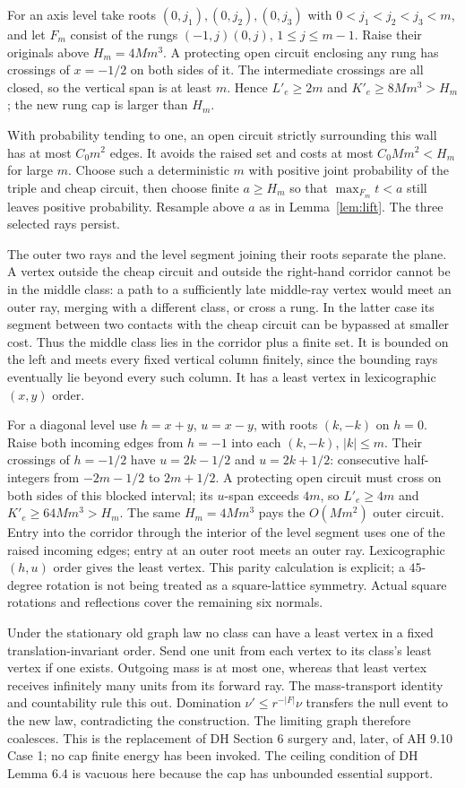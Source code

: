 For an axis level take roots $(0,j_1),(0,j_2),(0,j_3)$ with
$0<j_1<j_2<j_3<m$, and let $F_m$ consist of the rungs
$(-1,j)(0,j)$, $1\le j\le m-1$. Raise their originals above
$H_m=4Mm^3$. A protecting open circuit enclosing any rung has crossings
of $x=-1/2$ on both sides of it. The intermediate crossings are all closed,
so the vertical span is at least $m$. Hence $L'_e\ge2m$ and
$K'_e\ge8Mm^3>H_m$; the new rung cap is larger than $H_m$.

With probability tending to one, an open circuit strictly surrounding this
wall has at most $C_0m^2$ edges. It avoids the raised set and costs at most
$C_0Mm^2<H_m$ for large $m$. Choose such a deterministic $m$ with positive
joint probability of the triple and cheap circuit, then choose finite
$a\ge H_m$ so that $\max_{F_m}t<a$ still leaves positive probability.
Resample above $a$ as in Lemma~\ref{lem:lift}. The three selected rays persist.

The outer two rays and the level segment joining their roots separate the
plane. A vertex outside the cheap circuit and outside the right-hand corridor
cannot be in the middle class: a path to a sufficiently late middle-ray
vertex would meet an outer ray, merging with a different class, or cross a
rung. In the latter case its segment between two contacts with the cheap
circuit can be bypassed at smaller cost. Thus the middle class lies in the
corridor plus a finite set. It is bounded on the left and meets every fixed
vertical column finitely, since the bounding rays eventually lie beyond
every such column. It has a least vertex in lexicographic $(x,y)$ order.

For a diagonal level use $h=x+y$, $u=x-y$, with roots $(k,-k)$ on $h=0$.
Raise both incoming edges from $h=-1$ into each $(k,-k)$, $|k|\le m$.
Their crossings of $h=-1/2$ have $u=2k-1/2$ and $u=2k+1/2$: consecutive
half-integers from $-2m-1/2$ to $2m+1/2$. A protecting open circuit must
cross on both sides of this blocked interval; its $u$-span exceeds $4m$,
so $L'_e\ge4m$ and $K'_e\ge64Mm^3>H_m$. The same $H_m=4Mm^3$ pays the
$O(Mm^2)$ outer circuit. Entry into the corridor through the interior of
the level segment uses one of the raised incoming edges; entry at an outer
root meets an outer ray. Lexicographic $(h,u)$ order gives the least vertex.
This parity calculation is explicit; a $45$-degree rotation is not being
treated as a square-lattice symmetry. Actual square rotations and reflections
cover the remaining six normals.

Under the stationary old graph law no class can have a least vertex in a
fixed translation-invariant order. Send one unit from each vertex to its
class's least vertex if one exists. Outgoing mass is at most one, whereas
that least vertex receives infinitely many units from its forward ray.
The mass-transport identity and countability rule this out. Domination
$\nu'\le r^{-|F|}\nu$ transfers the null event to the new law, contradicting
the construction. The limiting graph therefore coalesces.
This is the replacement of DH Section 6 surgery and, later, of AH 9.10
Case 1; no cap finite energy has been invoked. The ceiling condition of
DH Lemma 6.4 is vacuous here because the cap has unbounded essential support.

